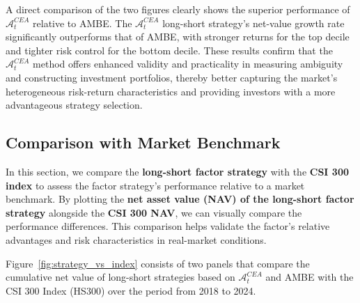 \documentclass[preprint,12pt,authoryear]{elsarticle}
\begin{document}
A direct comparison of the two figures clearly shows the superior
performance of \(\mathcal{A}^{CEA}_t\) relative to AMBE. The \(\mathcal{A}^{CEA}_t\) long-short strategy's
net-value growth rate significantly outperforms that of AMBE, with stronger returns for the top decile and tighter risk control for the bottom decile. These results confirm that the \(\mathcal{A}^{CEA}_t\) method offers enhanced validity and practicality in measuring ambiguity and constructing investment portfolios, thereby better capturing the market's heterogeneous risk-return characteristics and providing investors with a more advantageous strategy selection.



\subsection{Comparison with Market Benchmark}
In this section, we compare the \textbf{long-short factor strategy} with the \textbf{CSI 300 index} to assess the factor strategy's performance relative to a market benchmark. By plotting the \textbf{net asset value (NAV) of the long-short factor strategy} alongside the \textbf{CSI 300 NAV}, we can visually compare the performance differences. This comparison helps validate the factor's relative advantages and risk characteristics in real-market conditions.


Figure~\ref{fig:strategy_vs_index} consists of two panels that compare the cumulative net value of long-short strategies based on \(\mathcal{A}^{CEA}_t\) and AMBE with the CSI 300 Index (HS300) over the period from 2018 to 2024.
\end{document}
